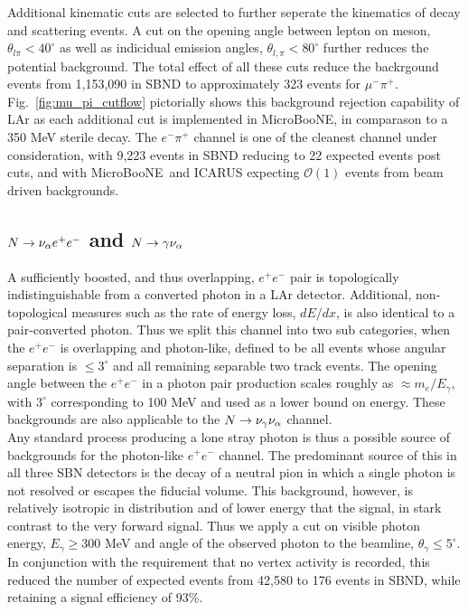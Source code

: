 \documentclass[11pt, a4paper]{article}
\newcommand{\reffig}[1]{Fig.~\ref{#1}}
\def\muboone{MicroBooNE}
\def\ster{\ensuremath N}
\begin{document}
Additional kinematic cuts are selected to further seperate the kinematics of
decay and scattering events. A cut on the opening angle between lepton on
meson, $\theta_{l \pi} < 40^\circ$ as well as indicidual emission angles,
$\theta_{l,\pi} < 80^\circ$ further reduces the potential background. The total
effect of all these cuts reduce the backrgound events from 1,153,090 in SBND to
approximately 323 events for $\mu^- \pi^+$.  \reffig{fig:mu_pi_cutflow}
pictorially shows this background rejection capability of LAr as each
additional cut is implemented in \muboone, in comparason to a 350 MeV sterile
decay. The $e^- \pi^+$ channel is one of the cleanest channel under
consideration, with 9,223 events in SBND reducing to 22 expected events post
cuts, and with \muboone\ and ICARUS expecting $\mathcal{O}(1)$ events from beam
driven backgrounds.


\subsection{$\ster \rightarrow \nu_\alpha e^+ e^-$ and $\ster \rightarrow \gamma \nu_\alpha$ }

A sufficiently boosted, and thus overlapping, $e^+e^-$ pair is topologically
indistinguishable from a converted photon in a LAr detector. Additional,
non-topological measures such as the rate of energy loss, $dE/dx$, is also
identical to a pair-converted photon. Thus we split this channel into two sub
categories, when the $e^+e^-$ is overlapping and photon-like, defined to be all
events whose angular separation is $\leq 3^\circ$\cite{Spitz:2011wba} and all
remaining separable two track events. The opening angle between the $e^+e^-$ in
a photon pair production scales roughly as $\approx m_e/E_\gamma$, with
$3^\circ$ corresponding to 100 MeV and used as a lower bound on energy. These
backgrounds are also applicable to the $\ster \rightarrow \nu_\gamma
\nu_\alpha$ channel.\\ 

Any standard process producing a lone stray photon is thus a possible source of
backgrounds for the photon-like $e^+e^-$ channel. The predominant source of
this in all three SBN detectors is the decay of a neutral pion in which a
single photon is not resolved or escapes the fiducial volume. This background,
however, is relatively isotropic in distribution and of lower energy that the
signal, in stark contrast to the very forward signal. Thus we apply a cut on
visible photon energy, $E_\gamma \geq 300 $ MeV and angle of the observed
photon to the beamline, $\theta_\gamma \leq 5^\circ$. In conjunction with the
requirement that no vertex activity is recorded, this reduced the number of
expected events from 42,580 to 176 events in SBND, while retaining a signal
efficiency of 93\%.
\end{document}
